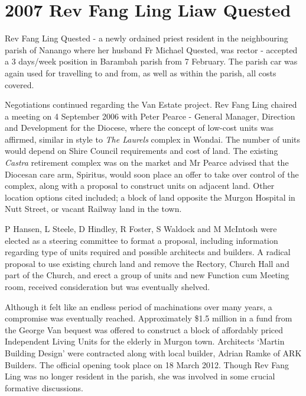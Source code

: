 \section{2007 Rev Fang Ling Liaw Quested}



Rev Fang Ling Quested - a newly ordained priest resident in the neighbouring parish of Nanango where her husband Fr Michael Quested, was rector - accepted a 3 days/week position in Barambah parish from 7 February. The parish car was again used for travelling to and from, as well as within the parish, all costs covered.



Negotiations continued regarding the Van Estate project. Rev Fang Ling chaired a meeting on 4 September 2006 with Peter Pearce - General Manager, Direction and Development for the Diocese, where the concept of low-cost units was affirmed, similar in style to \emph{The Laurels} complex in Wondai. The number of units would depend on Shire Council requirements and cost of land. The existing \emph{Castra} retirement complex was on the market and Mr Pearce advised that the Diocesan care arm, Spiritus, would soon place an offer to take over control of the complex, along with a proposal to construct units on adjacent land. Other location options cited included; a block of land opposite the Murgon Hospital in Nutt Street, or vacant Railway land in the town.



P Hansen, L Steele, D Hindley, R Foster, S Waldock and M McIntosh were elected as a steering committee to format a proposal, including information regarding type of units required and possible architects and builders. A radical proposal to use existing church land and remove the Rectory, Church Hall and part of the Church, and erect a group of units and new Function cum Meeting room, received consideration but was eventually shelved.



Although it felt like an endless period of machinations over many years, a compromise was eventually reached. Approximately \$1.5 million in a fund from the George Van bequest was offered to construct a block of affordably priced Independent Living Units for the elderly in Murgon town. Architects `Martin Building Design' were contracted along with local builder, Adrian Ramke of ARK Builders. The official opening took place on 18 March 2012. Though Rev Fang Ling was no longer resident in the parish, she was involved in some crucial formative discussions.



